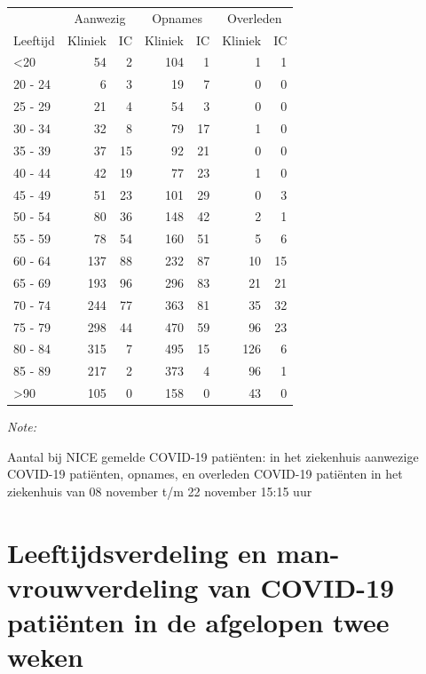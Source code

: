 \documentclass[
  english,
  man,floatsintext]{apa6}
\begin{document}
\begin{table}
\centering\begingroup\fontsize{10}{12}\selectfont

\begin{threeparttable}
\begin{tabular}{lrrrrrr}
\toprule
\multicolumn{1}{c}{ } & \multicolumn{2}{c}{Aanwezig} & \multicolumn{2}{c}{Opnames} & \multicolumn{2}{c}{Overleden} \\
\cmidrule(l{3pt}r{3pt}){2-3} \cmidrule(l{3pt}r{3pt}){4-5} \cmidrule(l{3pt}r{3pt}){6-7}
Leeftijd & Kliniek & IC & Kliniek & IC & Kliniek & IC\\
\midrule
<20 & 54 & 2 & 104 & 1 & 1 & 1\\
20 - 24 & 6 & 3 & 19 & 7 & 0 & 0\\
25 - 29 & 21 & 4 & 54 & 3 & 0 & 0\\
30 - 34 & 32 & 8 & 79 & 17 & 1 & 0\\
35 - 39 & 37 & 15 & 92 & 21 & 0 & 0\\
40 - 44 & 42 & 19 & 77 & 23 & 1 & 0\\
45 - 49 & 51 & 23 & 101 & 29 & 0 & 3\\
50 - 54 & 80 & 36 & 148 & 42 & 2 & 1\\
55 - 59 & 78 & 54 & 160 & 51 & 5 & 6\\
60 - 64 & 137 & 88 & 232 & 87 & 10 & 15\\
65 - 69 & 193 & 96 & 296 & 83 & 21 & 21\\
70 - 74 & 244 & 77 & 363 & 81 & 35 & 32\\
75 - 79 & 298 & 44 & 470 & 59 & 96 & 23\\
80 - 84 & 315 & 7 & 495 & 15 & 126 & 6\\
85 - 89 & 217 & 2 & 373 & 4 & 96 & 1\\
>90 & 105 & 0 & 158 & 0 & 43 & 0\\
\bottomrule
\end{tabular}
\begin{tablenotes}
\item \textit{Note: } 
\item Aantal bij NICE gemelde COVID-19 patiënten: in het ziekenhuis aanwezige COVID-19 patiënten, opnames, en overleden COVID-19 patiënten in het ziekenhuis van 08 november t/m 22 november 15:15 uur
\end{tablenotes}
\end{threeparttable}
\endgroup{}
\end{table}

\newpage

\hypertarget{leeftijdsverdeling-en-man-vrouwverdeling-van-covid-19-patiuxebnten-in-de-afgelopen-twee-weken}{%
\section{Leeftijdsverdeling en man-vrouwverdeling van COVID-19 patiënten in de afgelopen twee weken}\label{leeftijdsverdeling-en-man-vrouwverdeling-van-covid-19-patiuxebnten-in-de-afgelopen-twee-weken}}
\end{document}
